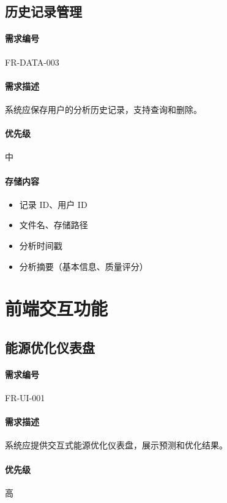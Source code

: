 \subsection{历史记录管理}

\paragraph{需求编号} FR-DATA-003

\paragraph{需求描述} 系统应保存用户的分析历史记录，支持查询和删除。

\paragraph{优先级} 中

\paragraph{存储内容}
\begin{itemize}
    \item 记录 ID、用户 ID
    \item 文件名、存储路径
    \item 分析时间戳
    \item 分析摘要（基本信息、质量评分）
\end{itemize}

\section{前端交互功能}

\subsection{能源优化仪表盘}

\paragraph{需求编号} FR-UI-001

\paragraph{需求描述} 系统应提供交互式能源优化仪表盘，展示预测和优化结果。

\paragraph{优先级} 高

